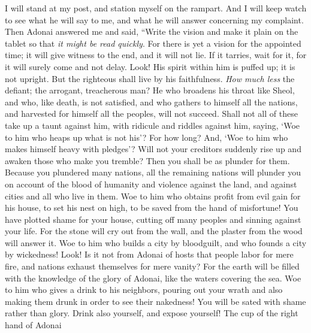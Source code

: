 \begin{biblechapter} %
 I will stand at my post, 
and station myself on the rampart. 
And I will keep watch to see what he will say to me, 
and what he will answer concerning my complaint.
\verse Then Adonai answered me and said, 
“Write the vision and make it plain on the tablet 
so that \textit{it might be read quickly}.
\verse For there is yet a vision for the appointed time; 
it will give witness to the end, and it will not lie. 
If it tarries, wait for it, 
for it will surely come and not delay.
\verse Look! His spirit within him is puffed up; 
it is not upright. 
But the righteous shall live by his faithfulness.
\verse \textit{How much less} the defiant; 
the arrogant, treacherous man? 
He who broadens his throat like Sheol, 
and who, like death, is not satisfied, 
and who gathers to himself all the nations, 
and harvested for himself all the peoples, 
will not succeed.
\verse Shall not all of these take up a taunt against him, 
with ridicule and riddles against him, saying, 
‘Woe to him who heaps up what is not his’? 
For how long? 
And, ‘Woe to him who makes himself heavy with pledges’?
\verse Will not your creditors suddenly rise up 
and awaken those who make you tremble? 
Then you shall be as plunder for them.
\verse Because you plundered many nations, 
all the remaining nations will plunder you 
on account of the blood of humanity 
and violence against the land, 
and against cities and all who live in them.
\verse Woe to him who obtains profit from evil gain for his house, 
to set his nest on high, 
to be saved from the hand of misfortune!
\verse You have plotted shame for your house, 
cutting off many peoples 
and sinning against your life.
\verse For the stone will cry out from the wall, 
and the plaster from the wood will answer it.
\verse Woe to him who builds a city by bloodguilt, 
and who founds a city by wickedness!
\verse Look! Is it not from Adonai of hosts 
that people labor for mere fire, 
and nations exhaust themselves for mere vanity?
\verse For the earth will be filled 
with the knowledge of the glory of Adonai, 
like the waters covering the sea.
\verse Woe to him who gives a drink to his neighbors, 
pouring out your wrath and also making them drunk 
in order to see their nakedness!
\verse You will be sated with shame rather than glory. 
Drink also yourself, and expose yourself! 
The cup of the right hand of Adonai 

\end{biblechapter}
